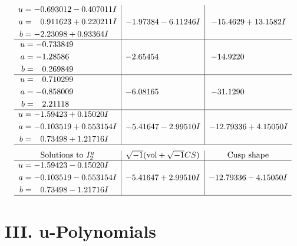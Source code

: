 \documentclass[1p]{elsarticle_modified}
\theoremstyle{definition}
\newcommand{\I}{\sqrt{-1}}
\begin{document}
$$\begin{array}{c|c|c}
\begin{aligned}
u &= -0.693012 - 0.407011 I \\
a &= \phantom{-}0.911623 + 0.220211 I \\
b &= -2.23098 + 0.93364 I\end{aligned}
 & -1.97384 - 6.11246 I & -15.4629 + 13.1582 I \\ \hline\begin{aligned}
u &= -0.733849\phantom{ +0.000000I} \\
a &= -1.28586\phantom{ +0.000000I} \\
b &= \phantom{-}0.269849\phantom{ +0.000000I}\end{aligned}
 & -2.65454\phantom{ +0.000000I} & -14.9220\phantom{ +0.000000I} \\ \hline\begin{aligned}
u &= \phantom{-}0.710299\phantom{ +0.000000I} \\
a &= -0.858009\phantom{ +0.000000I} \\
b &= \phantom{-}2.21118\phantom{ +0.000000I}\end{aligned}
 & -6.08165\phantom{ +0.000000I} & -31.1290\phantom{ +0.000000I} \\ \hline\begin{aligned}
u &= -1.59423 + 0.15020 I \\
a &= -0.103519 + 0.553154 I \\
b &= \phantom{-}0.73498 + 1.21716 I\end{aligned}
 & -5.41647 - 2.99510 I & -12.79336 + 4.15050 I\\
 \hline 
 \end{array}$$\newpage$$\begin{array}{c|c|c}  
\text{Solutions to }I^u_{2}& \I (\text{vol} + \sqrt{-1}CS) & \text{Cusp shape}\\
 \hline 
\begin{aligned}
u &= -1.59423 - 0.15020 I \\
a &= -0.103519 - 0.553154 I \\
b &= \phantom{-}0.73498 - 1.21716 I\end{aligned}
 & -5.41647 + 2.99510 I & -12.79336 - 4.15050 I\\
 \hline 
 \end{array}$$\newpage
\newpage\renewcommand{\arraystretch}{1}
\centering \section*{ III. u-Polynomials}
\end{document}

